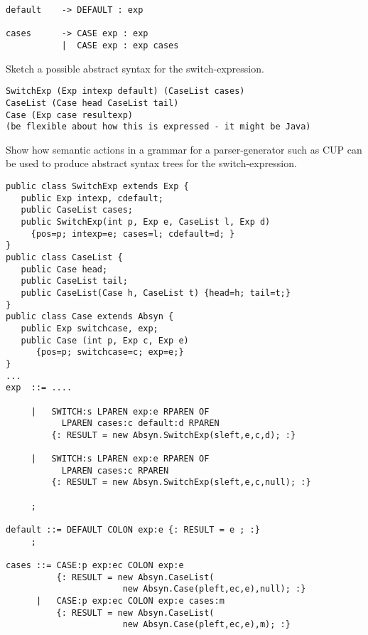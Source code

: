 \documentclass[11pt]{cityexam}
\begin{document}
\begin{questions}
\begin{subquestions}
\begin{modelanswer}
\begin{verbatim}
default    -> DEFAULT : exp

cases      -> CASE exp : exp
           |  CASE exp : exp cases
\end{verbatim}
\end{modelanswer}

\subquestion
Sketch a possible abstract syntax for the switch-expression.

\begin{modelanswer}
\begin{verbatim}
SwitchExp (Exp intexp default) (CaseList cases)
CaseList (Case head CaseList tail)
Case (Exp case resultexp) 
(be flexible about how this is expressed - it might be Java)
\end{verbatim}
\end{modelanswer}

\subquestion
Show how semantic actions in a grammar for a parser-generator such as CUP
can be used to produce abstract syntax trees for the switch-expression.

\begin{modelanswer}
\begin{verbatim}
public class SwitchExp extends Exp {
   public Exp intexp, cdefault;
   public CaseList cases;
   public SwitchExp(int p, Exp e, CaseList l, Exp d) 
     {pos=p; intexp=e; cases=l; cdefault=d; }
}
public class CaseList {
   public Case head;
   public CaseList tail;
   public CaseList(Case h, CaseList t) {head=h; tail=t;}
}
public class Case extends Absyn {
   public Exp switchcase, exp;
   public Case (int p, Exp c, Exp e) 
      {pos=p; switchcase=c; exp=e;}
}
...
exp  ::= ....

     |   SWITCH:s LPAREN exp:e RPAREN OF 
           LPAREN cases:c default:d RPAREN
         {: RESULT = new Absyn.SwitchExp(sleft,e,c,d); :}

     |   SWITCH:s LPAREN exp:e RPAREN OF 
           LPAREN cases:c RPAREN
         {: RESULT = new Absyn.SwitchExp(sleft,e,c,null); :}

     ;

default ::= DEFAULT COLON exp:e {: RESULT = e ; :}
     ;

cases ::= CASE:p exp:ec COLON exp:e
          {: RESULT = new Absyn.CaseList(
                       new Absyn.Case(pleft,ec,e),null); :}
      |   CASE:p exp:ec COLON exp:e cases:m
          {: RESULT = new Absyn.CaseList(
                       new Absyn.Case(pleft,ec,e),m); :}
\end{verbatim}
\end{modelanswer}
 

\end{subquestions}
\end{questions}
\end{document}
